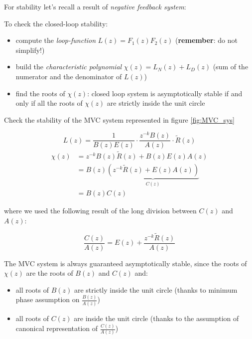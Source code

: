 \begin{rem}
    For stability let's recall a result of \emph{negative feedback system}:
    \begin{figure}[H]
        \centering
    \end{figure}

    To check the closed-loop stability:
    \begin{itemize}
        \item compute the \emph{loop-function} $L(z) = F_1(z) F_2(z)$ (\textbf{remember}: do not simplify!)
        \item build the \emph{characteristic polynomial} $\chi(z) = L_N(z) + L_D(z)$ (sum of the numerator and the denominator of $L(z)$)
        \item find the roots of $\chi(z)$: closed loop system is asymptotically stable if and only if all the roots of $\chi(z)$ are strictly inside the unit circle
    \end{itemize}
\end{rem}

Check the stability of the MVC system represented in figure \ref{fig:MVC_sys}

\[
    L(z) = \frac{1}{B(z)E(z)}\cdot \frac{z^{-k}B(z)}{A(z)}\cdot\tilde{R}(z)
\]
\begin{align*}
    \chi(z) &= z^{-k}B(z)\tilde{R}(z) + B(z)E(z)A(z) \\
    &= B(z) \underbrace{\left( z^{-k}\tilde{R}(z)+E(z)A(z) \right)}_{C(z)}  \\
    &= B(z)C(z)
\end{align*}

where we used the following result of the long division between $C(z)$ and $A(z)$:

\[ \frac{C(z)}{A(z)} = E(z) + \frac{z^{-k} \tilde{R}(z)}{A(z)} \]

The MVC system is always guaranteed asymptotically stable, since the roots of $\chi(z)$ are the roots of $B(z)$ and $C(z)$ and:
\begin{itemize}
    \item all roots of $B(z)$ are strictly inside the unit circle (thanks to minimum phase assumption on $\frac{B(z)}{A(z)}$)
    \item all roots of $C(z)$ are inside the unit circle (thanks to the assumption of canonical representation of $\frac{C(z)}{A(z)}$)
\end{itemize}

